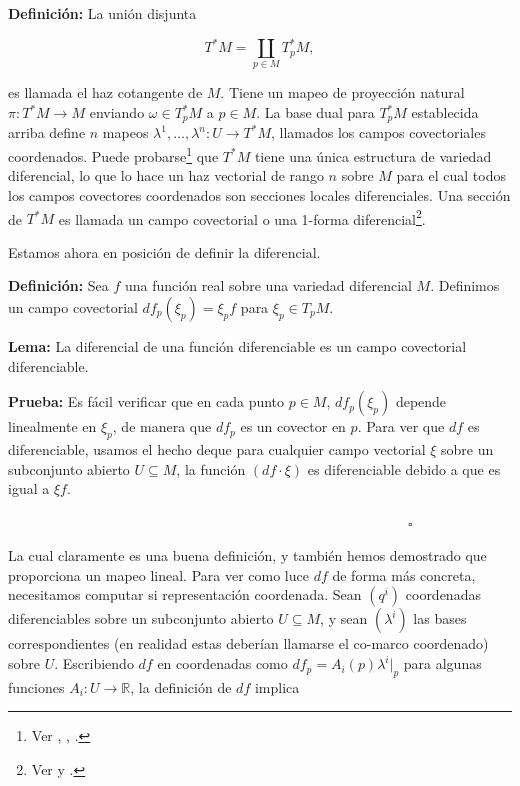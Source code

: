 \documentclass[a4paper,10pt]{article}
\numberwithin{equation}{section}
\newcommand{\definicion}{\textbf{Definición: }}
\newcommand{\lema}{\textbf{Lema: }}
\newcommand{\prueba}{\textbf{Prueba: }}
\begin{document}
\vspace{.3cm}

\definicion La unión disjunta 

\begin{equation}
 T^*M =  \underset{p \in M}{\coprod} T^*_p M,
\end{equation}

es llamada el haz cotangente de $M$. Tiene un mapeo de proyección natural 
$\pi: T^* M \rightarrow M$ enviando $\omega \in T^*_p M$ a $p \in M$. La base dual 
para $T^*_p M$ establecida arriba define $n$ mapeos $\lambda^1,\dots,\lambda^n: 
U \rightarrow T^*M$, llamados los campos covectoriales coordenados. Puede probarse\footnote{
Ver \cite{curtis}, \cite{lee}, \cite{kosinski}.} que $T^*M$ tiene una única 
estructura de variedad diferencial, lo que lo hace un haz vectorial de rango $n$ 
sobre $M$ para el cual todos los campos covectores coordenados son secciones 
locales diferenciales. Una sección de $T^* M$ es llamada un campo covectorial 
o una 1-forma diferencial\footnote{Ver \cite{lee} y \cite{torres}.}.

\vspace{.3cm}

Estamos ahora en posición de definir la diferencial.

\vspace{.3cm}

\definicion Sea $f$ una función real sobre una variedad diferencial $M$. Definimos 
un campo covectorial $df_p(\xi_p) = \xi_p f$ para $\xi_p \in T_p M$. 

\vspace{.3cm}

\lema La diferencial de una función diferenciable es un campo covectorial diferenciable.

\vspace{.3cm}

\prueba Es fácil verificar que en cada punto $p \in M$, $df_p(\xi_p)$ depende linealmente 
en $\xi_p$, de manera que $df_p$ es un covector en $p$. Para ver que $df$ es diferenciable, 
usamos el hecho deque para cualquier campo vectorial $\xi$ sobre un subconjunto 
abierto $U \subseteq M$, la función $(df \cdot \xi)$ es diferenciable debido a que 
es igual a $\xi f$.

$\hspace{12cm} \square$

La cual claramente es una buena definición, y también hemos demostrado que proporciona 
un mapeo lineal. Para ver como luce $df$ de forma más concreta, necesitamos computar si representación 
coordenada. Sean $(q^i)$ coordenadas diferenciables sobre un subconjunto abierto 
$U \subseteq M$, y sean $(\lambda^i)$ las bases correspondientes (en realidad 
estas deberían llamarse el co-marco coordenado) sobre $U$. Escribiendo $df$ en 
coordenadas como $df_p = A_i(p)\lambda^i|_p$ para algunas funciones $A_i:U\rightarrow \mathbb{R}$, 
la definición de $df$ implica 
\end{document}
